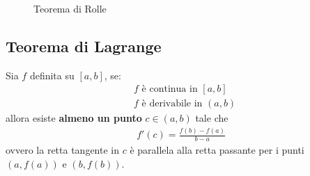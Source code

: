 \documentclass{book}
\begin{document}
\begin{minipage}{\textwidth}
\begin{figure}[H]
        \caption{Teorema di Rolle}
    \end{figure}
\end{minipage}

\begin{theorem}
    \subsection{Teorema di Lagrange}
    Sia \(f\) definita su \([a,b]\), se:
    \begin{align*}
         & f \text{ è continua in } [a,b]   \\
         & f \text{ è derivabile in } (a,b)
    \end{align*}
    allora esiste \textbf{almeno un punto} \(c \in (a,b)\) tale che
    \begin{align*}
        f'(c)=\frac{f(b)-f(a)}{b-a}
    \end{align*}
    ovvero la retta tangente in \(c\) è parallela alla retta passante per i punti \((a,f(a))\) e \((b,f(b))\).
\end{theorem}
\end{document}
